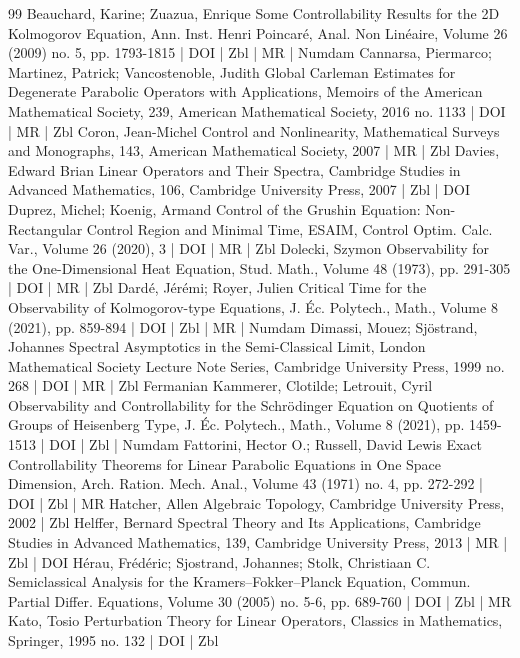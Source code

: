\documentclass[10pt]{amsart}
\theoremstyle{definition}\newtheorem{defi}[theo]{Definition}\newtheorem{rema}[theo]{Remark}\newtheorem{exam}[theo]{Example}\newtheorem{exem}[theo]{Example}\newtheorem{nota}[theo]{Notation}
\newcommand{\1}{\mathds 1}
\begin{document}
\begin{thebibliography}{99}
Beauchard, Karine; Zuazua, Enrique Some Controllability Results for the 2D Kolmogorov Equation, Ann. Inst. Henri Poincaré, Anal. Non Linéaire, Volume 26 (2009) no. 5, pp. 1793-1815 | DOI | Zbl | MR | Numdam
Cannarsa, Piermarco; Martinez, Patrick; Vancostenoble, Judith Global Carleman Estimates for Degenerate Parabolic Operators with Applications, Memoirs of the American Mathematical Society, 239, American Mathematical Society, 2016 no. 1133 | DOI | MR | Zbl
Coron, Jean-Michel Control and Nonlinearity, Mathematical Surveys and Monographs, 143, American Mathematical Society, 2007 | MR | Zbl
Davies, Edward Brian Linear Operators and Their Spectra, Cambridge Studies in Advanced Mathematics, 106, Cambridge University Press, 2007 | Zbl | DOI
Duprez, Michel; Koenig, Armand Control of the Grushin Equation: Non-Rectangular Control Region and Minimal Time, ESAIM, Control Optim. Calc. Var., Volume 26 (2020), 3 | DOI | MR | Zbl
Dolecki, Szymon Observability for the One-Dimensional Heat Equation, Stud. Math., Volume 48 (1973), pp. 291-305 | DOI | MR | Zbl
Dardé, Jérémi; Royer, Julien Critical Time for the Observability of Kolmogorov-type Equations, J. Éc. Polytech., Math., Volume 8 (2021), pp. 859-894 | DOI | Zbl | MR | Numdam
Dimassi, Mouez; Sjöstrand, Johannes Spectral Asymptotics in the Semi-Classical Limit, London Mathematical Society Lecture Note Series, Cambridge University Press, 1999 no. 268 | DOI | MR | Zbl
Fermanian Kammerer, Clotilde; Letrouit, Cyril Observability and Controllability for the Schrödinger Equation on Quotients of Groups of Heisenberg Type, J. Éc. Polytech., Math., Volume 8 (2021), pp. 1459-1513 | DOI | Zbl | Numdam
Fattorini, Hector O.; Russell, David Lewis Exact Controllability Theorems for Linear Parabolic Equations in One Space Dimension, Arch. Ration. Mech. Anal., Volume 43 (1971) no. 4, pp. 272-292 | DOI | Zbl | MR
Hatcher, Allen Algebraic Topology, Cambridge University Press, 2002 | Zbl
Helffer, Bernard Spectral Theory and Its Applications, Cambridge Studies in Advanced Mathematics, 139, Cambridge University Press, 2013 | MR | Zbl | DOI
Hérau, Frédéric; Sjostrand, Johannes; Stolk, Christiaan C. Semiclassical Analysis for the Kramers–Fokker–Planck Equation, Commun. Partial Differ. Equations, Volume 30 (2005) no. 5-6, pp. 689-760 | DOI | Zbl | MR
Kato, Tosio Perturbation Theory for Linear Operators, Classics in Mathematics, Springer, 1995 no. 132 | DOI | Zbl

\end{thebibliography}
\end{document}
